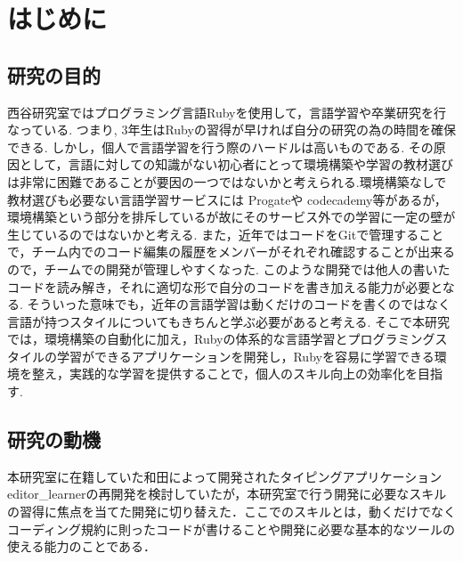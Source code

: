 \chapter{はじめに}\label{ux306fux3058ux3081ux306b}

    \section{研究の目的}\label{ux7814ux7a76ux306eux76eeux7684}

    西谷研究室ではプログラミング言語Ruby\cite{ruby}を使用して，言語学習や卒業研究を行なっている. つまり, 3年生はRubyの習得が早ければ自分の研究の為の時間を確保できる. しかし，個人で言語学習を行う際のハードルは高いものである\cite{Oshimi}. その原因として，言語に対しての知識がない初心者にとって環境構築や学習の教材選びは非常に困難であることが要因の一つではないかと考えられる.環境構築なしで教材選びも必要ない言語学習サービスには Progate\cite{Progate}や codecademy\cite{codecademy}等があるが，環境構築という部分を排斥しているが故にそのサービス外での学習に一定の壁が生じているのではないかと考える.
また，近年ではコードをGitで管理することで，チーム内でのコード編集の履歴をメンバーがそれぞれ確認することが出来るので，チームでの開発が管理しやすくなった\cite{GitDevelopment}. このような開発では他人の書いたコードを読み解き，それに適切な形で自分のコードを書き加える能力が必要となる. そういった意味でも，近年の言語学習は動くだけのコードを書くのではなく言語が持つスタイルについてもきちんと学ぶ必要があると考える.
そこで本研究では，環境構築の自動化に加え，Rubyの体系的な言語学習とプログラミングスタイルの学習ができるアプリケーションを開発し，Rubyを容易に学習できる環境を整え，実践的な学習を提供することで，個人のスキル向上の効率化を目指す.

    \section{研究の動機}\label{ux7814ux7a76ux306eux52d5ux6a5f}

    本研究室に在籍していた和田によって開発されたタイピングアプリケーションeditor\_learner\cite{editor_learner}の再開発を検討していたが，本研究室で行う開発に必要なスキルの習得に焦点を当てた開発に切り替えた．ここでのスキルとは，動くだけでなくコーディング規約に則ったコードが書けることや開発に必要な基本的なツールの使える能力のことである．
